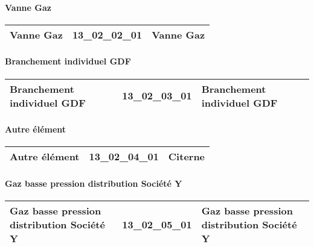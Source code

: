 \documentclass[12pt,titlepage,oneside]{book}
\begin{document}
\paragraph{Vanne Gaz}
\noindent
\vspace{\baselineskip}

\renewcommand{\arraystretch}{1.2}
\begin{supertabular}{|p{10cm}|c|p{15cm}|}
 Vanne Gaz & 13\_02\_02\_01 & Vanne Gaz\\
\hline
\end{supertabular}


\paragraph{Branchement individuel GDF}
\noindent
\vspace{\baselineskip}

\renewcommand{\arraystretch}{1.2}
\begin{supertabular}{|p{10cm}|c|p{15cm}|}
 Branchement individuel GDF & 13\_02\_03\_01 & Branchement individuel GDF\\
\hline
\end{supertabular}


\paragraph{Autre élément}
\noindent
\vspace{\baselineskip}

\renewcommand{\arraystretch}{1.2}
\begin{supertabular}{|p{10cm}|c|p{15cm}|}
 Autre élément & 13\_02\_04\_01 & Citerne\\
\hline
\end{supertabular}


\paragraph{Gaz basse pression distribution Société Y}
\noindent
\vspace{\baselineskip}

\renewcommand{\arraystretch}{1.2}
\begin{supertabular}{|p{10cm}|c|p{15cm}|}
 Gaz basse pression distribution Société Y & 13\_02\_05\_01 & Gaz basse pression distribution Société Y\\
\hline
\end{supertabular}
\end{document}
